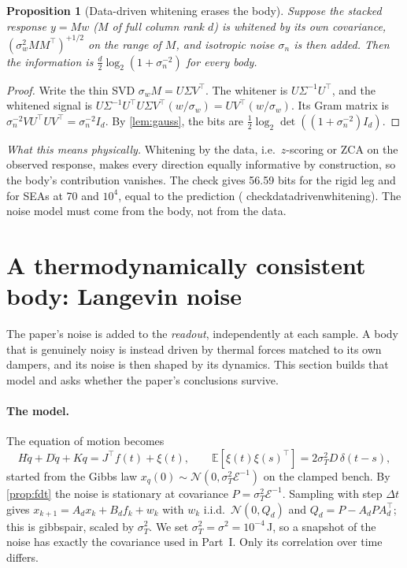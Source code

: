 \documentclass[11pt]{article}
\newtheorem{proposition}[theorem]{Proposition}
\theoremstyle{definition}
\theoremstyle{remark}
\newcommand{\E}{\mathbb{E}}
\newcommand{\Em}{\mathcal{E}}         %
\newcommand{\codeus}{\textunderscore\allowbreak}
\newcommand{\code}[1]{{\ttfamily\let\_\codeus\hyphenchar\font=-1 #1}}
\newcommand{\phys}[1]{\par\smallskip\noindent\textit{What this means physically.} #1\par}
\begin{document}
\begin{proposition}[Data-driven whitening erases the body]\label{prop:datadriven}
Suppose the stacked response $y=Mw$ ($M$ of full column rank $d$) is whitened by its own
covariance, $(\sigma_w^2MM^\top)^{+1/2}$ on the range of $M$, and isotropic noise
$\sigma_n$ is then added. Then the information is $\frac d2\log_2(1+\sigma_n^{-2})$ for
\emph{every} body.
\end{proposition}
\begin{proof}
Write the thin SVD $\sigma_wM=U\Sigma V^\top$. The whitener is $U\Sigma^{-1}U^\top$, and
the whitened signal is $U\Sigma^{-1}U^\top U\Sigma V^\top(w/\sigma_w)=UV^\top(w/\sigma_w)$.
Its Gram matrix is $\sigma_n^{-2}VU^\top UV^\top=\sigma_n^{-2}I_d$. By \cref{lem:gauss},
the bits are $\frac12\log_2\det((1+\sigma_n^{-2})I_d)$.
\end{proof}

\phys{Whitening by the data, i.e.\ $z$-scoring or ZCA on the observed response, makes every
direction equally informative by construction, so the body's contribution vanishes. The
check gives 56.59 bits for the rigid leg and for SEAs at 70 and $10^4$, equal to the
prediction (\code{check\_data\_driven\_whitening}). The noise model must come from the body,
not from the data.}

\section{A thermodynamically consistent body: Langevin noise}
\label{sec:langevin}

The paper's noise is added to the \emph{readout}, independently at each sample. A body
that is genuinely noisy is instead driven by thermal forces matched to its own dampers,
and its noise is then shaped by its dynamics. This section builds that model and asks
whether the paper's conclusions survive.

\paragraph{The model.} The equation of motion becomes
\[
  H\ddot q+D\dot q+Kq=J^\top f(t)+\xi(t),\qquad
  \E[\xi(t)\xi(s)^\top]=2\sigma_T^2D\,\delta(t-s),
\]
started from the Gibbs law $x_q(0)\sim\mathcal N(0,\sigma_T^2\Em^{-1})$ on the clamped
bench. By \cref{prop:fdt} the noise is stationary at covariance $P=\sigma_T^2\Em^{-1}$.
Sampling with step $\Delta t$ gives $x_{k+1}=A_dx_k+B_df_k+w_k$ with $w_k$ i.i.d.\
$\mathcal N(0,Q_d)$ and $Q_d=P-A_dPA_d^\top$; this is \code{gibbs\_pair}, scaled by
$\sigma_T^2$. We set $\sigma_T^2=\sigma^2=10^{-4}$\,J, so a snapshot of the noise has
exactly the covariance used in Part~I. Only its correlation over time differs.
\end{document}
